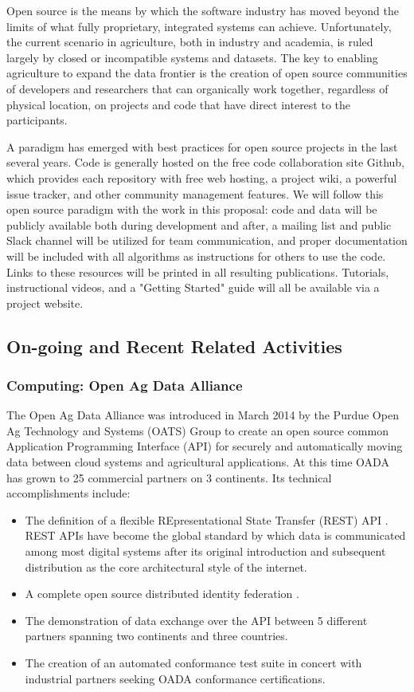 \documentclass[11pt]{article}
\begin{document}
Open source is the means by which the software industry has moved beyond the limits of what fully proprietary, integrated systems 
can achieve.  Unfortunately, the current scenario in agriculture, both in industry and academia, is ruled largely by closed or incompatible 
systems and datasets. The key to enabling agriculture to expand the data frontier is the creation of open source communities of 
developers and researchers that can organically work together, regardless of physical location, on projects and code that have 
direct interest to the participants. 

A paradigm has emerged with best practices for open source projects in the last several years.  Code is generally hosted on the free 
code collaboration site Github, which provides each repository with free web hosting, a project wiki, a powerful issue tracker, and other 
community management features.  We will follow this open source paradigm with the work in this proposal: code and data will be publicly 
available both during development and after, a mailing list and public Slack channel will be utilized for team communication, and proper 
documentation will be included with all algorithms as instructions for others to use the code.  Links to these resources will be printed in 
all resulting publications.  Tutorials, instructional videos, and a "Getting Started" guide will all be available via a project website.

\subsection{On-going and Recent Related Activities}

\subsubsection{Computing: Open Ag Data Alliance}   

The Open Ag Data Alliance was introduced in March 2014 by the Purdue Open Ag Technology and Systems (OATS) 
Group to create an open source common Application Programming Interface (API) for securely and automatically moving 
data between cloud systems and agricultural applications. At this time OADA has grown to 25 commercial partners on 3 
continents. Its technical accomplishments include:

\begin{itemize}
\item The definition of a flexible REpresentational State Transfer (REST) API \cite{Ault:15a}.  REST APIs have 
	become the global standard by which data is communicated among most digital systems after its original introduction
	\cite{Fielding:00} and subsequent distribution as the core architectural style of the internet.
\item A complete open source distributed identity federation \cite{Ault:15b}.
\item The demonstration of data exchange over the API between 5 different partners spanning two continents and three countries. 
\item The creation of an automated conformance test suite in concert with industrial partners seeking OADA conformance certifications.
\end{itemize}
\end{document}
